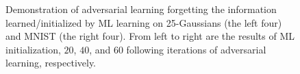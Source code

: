 \documentclass[letterpaper]{article} %
\begin{document}
\begin{figure}[H]
	\begin{center}
		
		\caption{\small 
			Demonstration of adversarial learning forgetting the information learned/initialized by ML learning on 25-Gaussians \cite{tao2018chi} (the left four) and MNIST \cite{lecun1998gradient} (the right four). From left to right are the results of ML initialization, $20$, $40$, and $60$ following iterations of adversarial learning, respectively. 
		}
		\label{fig:app_explodes}
	\end{center}
\end{figure}
\end{document}
